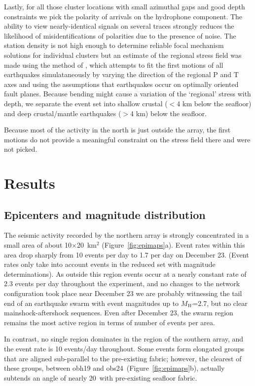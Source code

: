 \documentclass[reviewcopy]{elsart}
\begin{document}
Lastly, for all those cluster locations 
with small azimuthal
gaps and good depth constraints we pick the polarity of arrivals on the hydrophone
component. The ability to view nearly-identical signals on several
traces strongly reduces the likelihood of misidentifications of
polarities due to the presence of noise. The station density is not
high enough to determine reliable focal mechanism solutions for
individual clusters but an estimate of the regional stress field was
made using the method of \citet{robinson00}, which attempts to fit the
first motions of all earthquakes simulataneously by varying the
direction of the regional P and T axes and using the assumptions that earthquakes
occur on optimally oriented fault planes.  Because bending might cause
a variation of the `regional' stress with depth, we separate the event set
into shallow crustal ($<$4 km below the seafloor) and deep
crustal/mantle earthquakes ($>$4 km) below the seafloor.

Because most of the activity in the north is just outside the array,
the first motions do not provide a meaningful constraint on the
stress field there and were not picked.

\section{Results}

\subsection{Epicenters and magnitude distribution}

The seismic activity recorded by the northern array is strongly
concentrated in a small area of about 10$\times$20~km$^2$
(Figure~\ref{fig:epimaps}a).  Event
rates within this area drop sharply from 10 events per day to 1.7 per
day on December
23. (Event rates only take into account events in the reduced set with
magnitude
determinations).  As outside this region events occur at  a nearly constant rate of
2.3 events per day throughout the experiment, and no  changes to the network configuration took
place near December 23 we are probably witnessing the tail end of an
earthquake swarm with event magnitudes up to $M_W$=2.7, but no clear
mainshock-aftershock sequences.   Even after December 23, the swarm
region remains the most active region in terms of number of events per
area.

In contrast, no single region dominates in the region of the southern
array, and the event rate is 10 
events/day throughout.  Some events form elongated groups that are
aligned sub-parallel to the pre-existing fabric; however, the clearest
of these groups,
between obh19 and obs24~(Figure~\ref{fig:epimaps}b), actually subtends an angle
of nearly 20\dg\ with pre-existing seafloor fabric.  
\end{document}
